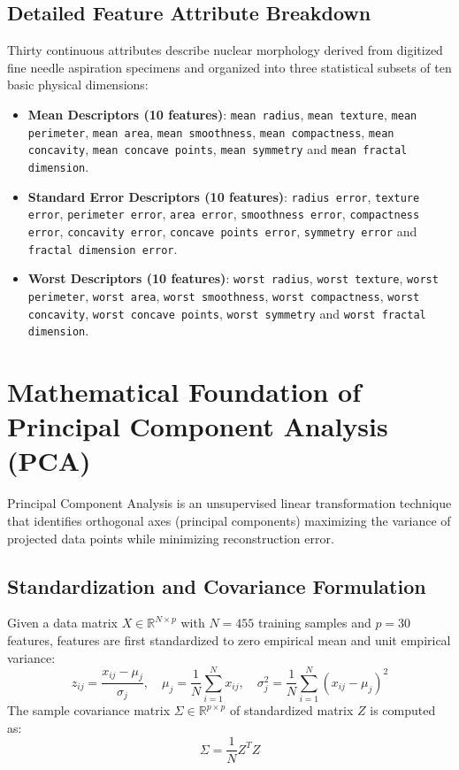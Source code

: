 \documentclass[12pt,a4paper]{article}
\begin{document}
\subsection*{Detailed Feature Attribute Breakdown}
Thirty continuous attributes describe nuclear morphology derived from digitized fine needle aspiration specimens and organized into three statistical subsets of ten basic physical dimensions:
\begin{itemize}
\item \textbf{Mean Descriptors (10 features)}: \texttt{mean radius}, \texttt{mean texture}, \texttt{mean perimeter}, \texttt{mean area}, \texttt{mean smoothness}, \texttt{mean compactness}, \texttt{mean concavity}, \texttt{mean concave points}, \texttt{mean symmetry} and \texttt{mean fractal dimension}.
\item \textbf{Standard Error Descriptors (10 features)}: \texttt{radius error}, \texttt{texture error}, \texttt{perimeter error}, \texttt{area error}, \texttt{smoothness error}, \texttt{compactness error}, \texttt{concavity error}, \texttt{concave points error}, \texttt{symmetry error} and \texttt{fractal dimension error}.
\item \textbf{Worst Descriptors (10 features)}: \texttt{worst radius}, \texttt{worst texture}, \texttt{worst perimeter}, \texttt{worst area}, \texttt{worst smoothness}, \texttt{worst compactness}, \texttt{worst concavity}, \texttt{worst concave points}, \texttt{worst symmetry} and \texttt{worst fractal dimension}.
\end{itemize}

\section{Mathematical Foundation of Principal Component Analysis (PCA)}

Principal Component Analysis is an unsupervised linear transformation technique that identifies orthogonal axes (principal components) maximizing the variance of projected data points while minimizing reconstruction error.

\subsection{Standardization and Covariance Formulation}
Given a data matrix $X \in \mathbb{R}^{N \times p}$ with $N = 455$ training samples and $p = 30$ features, features are first standardized to zero empirical mean and unit empirical variance:
\begin{equation}
z_{ij} = \frac{x_{ij} - \mu_j}{\sigma_j}, \quad \mu_j = \frac{1}{N}\sum_{i=1}^N x_{ij}, \quad \sigma_j^2 = \frac{1}{N}\sum_{i=1}^N (x_{ij} - \mu_j)^2
\end{equation}
The sample covariance matrix $\Sigma \in \mathbb{R}^{p \times p}$ of standardized matrix $Z$ is computed as:
\begin{equation}
\Sigma = \frac{1}{N} Z^T Z
\end{equation}
\end{document}
